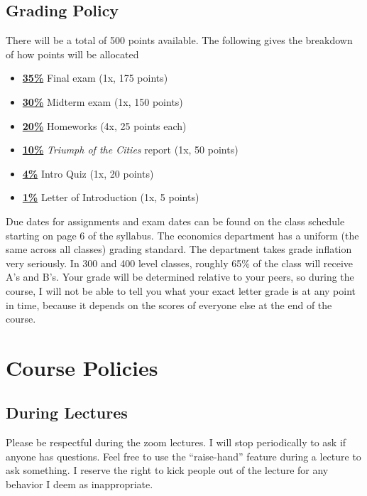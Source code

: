 \documentclass[11pt]{article}
\begin{document}
	

	\subsection*{Grading Policy}
	There will be a total of 500 points available. The following gives the breakdown of how points will be allocated 
	\begin{itemize}
		\item \underline{\textbf{35\%}}  Final exam (1x, 175 points)
		\item \underline{\textbf{30\%}} Midterm exam (1x, 150 points)
		\item \underline{\textbf{20\%}}   Homeworks (4x, 25 points each)
		\item \underline{\textbf{10\%}} \textit{Triumph of the Cities} report (1x, 50 points)
		\item \underline{\textbf{4\%}}  Intro Quiz  (1x, 20 points)
		\item \underline{\textbf{1\%}} Letter of Introduction (1x, 5 points)
		
	\end{itemize}

Due dates for assignments and exam dates can be found on the class schedule starting on page 6 of the syllabus. The economics department has a uniform (the same across all classes) grading standard.  The department takes grade inflation very seriously. In 300 and 400 level classes, roughly 65\% of the class will receive A's and B's. Your grade will be determined relative to your peers, so during the course, I will not be able to tell you what your exact letter grade is at any point in time, because it depends on the scores of everyone else at the end of the course.



	
	
	
	
	\section*{Course Policies}
	
	
	
	\subsection*{During Lectures}
	
Please be respectful during the zoom lectures.  I will stop periodically to ask if anyone has questions. Feel free to use the ``raise-hand'' feature during a lecture to ask something. I reserve the right to kick people out of the lecture for any behavior I deem as inappropriate.  
	
\end{document}
